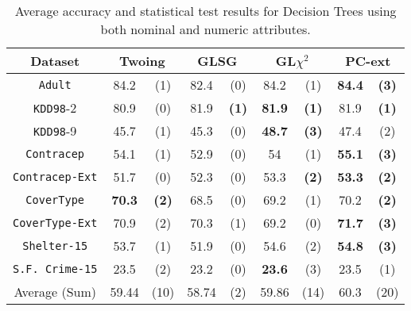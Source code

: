 \begin{table}
\small
\caption{Average accuracy and statistical test results for  Decision Trees using both nominal and numeric attributes.}
\centering
\begin{tabular}{c|cc|cc|cc|cc} 
Dataset            &\multicolumn{2}{c|}{Twoing} & \multicolumn{2}{c|}{GLSG} & \multicolumn{2}{c|}{GL$\chi^2$} & \multicolumn{2}{c}{PC-ext}\\  \hline   
{\tt Adult}        & 84.2           & (1)       & 82.4       & (0)          &  84.2       & (1)               & {\bf 84.4 } & {\bf (3) }  \\
{\tt KDD98}-2      & 80.9           & (0)       & 81.9       & {\bf (1)}    & {\bf 81.9 } & {\bf (1)}         & 81.9        & {\bf (1) }  \\ 
{\tt KDD98}-9      & 45.7           & (1)       & 45.3       &  (0)         & {\bf 48.7 } & {\bf (3)  }       &  47.4       & (2)         \\ 
{\tt Contracep}    & 54.1           & (1)       & 52.9       &  (0)         & 54          & (1)               & {\bf 55.1 } & {\bf (3) }  \\ 
{\tt Contracep-Ext}& 51.7           & (0)       & 52.3       &  (0)         & 53.3        & {\bf (2)  }       & {\bf 53.3 } & {\bf (2) }  \\ 
{\tt CoverType}    &  {\bf 70.3 }   & {\bf (2)} & 68.5       &  (0)         & 69.2        & (1)               &  70.2       & {\bf (2) }  \\ 
{\tt CoverType-Ext}& 70.9           & (2)       & 70.3       &  (1)         & 69.2        & (0)               & {\bf 71.7 } & {\bf (3) }  \\ 
{\tt Shelter-15}   & 53.7           & (1)       & 51.9       &  (0)         & 54.6        & (2)               & {\bf 54.8 } & {\bf (3) }  \\   
{\tt S.F. Crime-15}& 23.5           & (2)       & 23.2       &  (0)         & {\bf 23.6 } & (3)               & 23.5        & (1)         \\ 
\hline
Average (Sum)      & 59.44          & (10)      & 58.74      &  (2)         & 59.86       & (14)              & 60.3        & (20)

\end{tabular}
\label{exp:secondsetnumeric}
\normalsize
\end{table}


